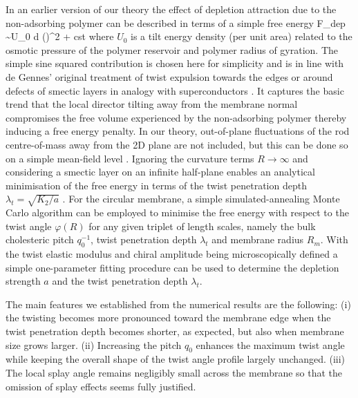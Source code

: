 In an earlier version of our theory \cite{wensink2018elastic} the effect of depletion attraction due to the non-adsorbing polymer can be described in terms of a simple free energy 
\beq
F_{dep}  \sim U_{0} \int d \brr  (\sin \varphi )^{2}  + {\rm cst}
\eeq
where $U_{0}$ is a tilt energy density (per unit area) related to the osmotic pressure of the polymer reservoir and polymer radius of gyration. The simple sine squared contribution is chosen here for simplicity and is in line with de Gennes' original treatment of twist expulsion towards the edges or around defects of smectic layers in analogy with superconductors \cite{gennes-prost, barry_jpcb2009}. It captures the basic trend that the local director tilting away from the membrane normal compromises the free volume experienced by the non-adsorbing polymer  thereby inducing a free energy penalty. In our theory, out-of-plane fluctuations of the rod centre-of-mass away from the 2D plane are not included, but this can be done so on a simple mean-field level \cite{kang_sm2016}.
Ignoring the curvature terms  $R \rightarrow \infty $ and considering a smectic layer on an infinite half-plane enables an analytical minimisation of the free energy in terms of the twist penetration depth $\lambda_{t}  =  \sqrt{K_{2}/a} $ \cite{gennes-prost,barry_jpcb2009}. For the circular membrane, a simple simulated-annealing Monte Carlo algorithm can be employed to minimise the free energy with respect to the twist angle $\varphi(R)$ for any given triplet of length scales, namely the bulk cholesteric pitch $q_{0}^{-1} $, twist penetration depth $\lambda_{t} $ and membrane radius $R_{m}$. With the twist elastic modulus and chiral amplitude being microscopically defined  a simple one-parameter fitting procedure can be used to determine the depletion strength $a$ and the twist penetration depth $\lambda_{t}$. 



 The main features we established from the numerical results \cite{wensink2018elastic} are the following:  (i) the twisting becomes more pronounced toward the membrane edge when the twist penetration depth becomes shorter, as expected,  but also when membrane size grows larger. (ii) Increasing the pitch $q_{0}$  enhances the maximum twist angle while keeping the overall shape of the twist angle profile largely unchanged. (iii) The local splay angle remains negligibly small  across the membrane so that the omission of splay effects seems fully justified.




